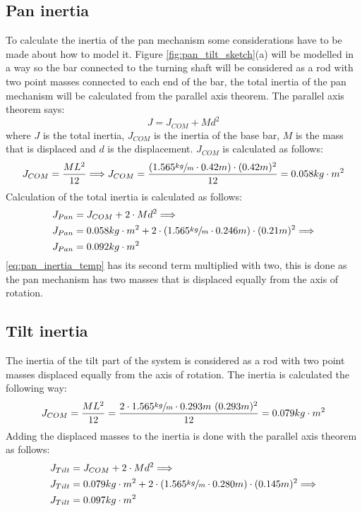 \subsection{Pan inertia}
To calculate the inertia of the pan mechanism some considerations have to be made about how to model it. Figure \ref{fig:pan_tilt_sketch}(a) will be modelled in a way so the bar connected to the turning shaft will be considered as a rod with two point masses connected to each end of the bar, the total inertia of the pan mechanism will be calculated from the parallel axis theorem. The parallel axis theorem says:
\begin{equation}
	J = J_{COM} + M d^{2} \label{eq:parallel_axis_theorem}
\end{equation}
where $J$ is the total inertia, $J_{COM}$ is the inertia of the base bar, $M$ is the mass that is displaced and $d$ is the displacement. $J_{COM}$ is calculated as follows:
\begin{equation}
	J_{COM} = \dfrac{M L^{2}}{12} \Longrightarrow J_{COM} = \dfrac{(1.565\sfrac{kg}{m} \cdot 0.42m) \cdot (0.42m)^{2}}{12} = 0.058 kg \cdot m^{2}
\end{equation}
Calculation of the total inertia is calculated as follows:
\begin{align}
J_{Pan} &= J_{COM} + 2 \cdot M d^{2} \Longrightarrow \\
J_{Pan} &= 0.058 kg \cdot m^{2} + 2 \cdot (1.565\sfrac{kg}{m} \cdot 0.246m) \cdot (0.21m)^{2} \Longrightarrow \label{eq:pan_inertia_temp} \\ 
J_{Pan} &= 0.092 kg \cdot m^{2}\label{eq:pan_inertia}
\end{align}
\ref{eq:pan_inertia_temp} has its second term multiplied with two, this is done as the pan mechanism has two masses that is displaced equally from the axis of rotation.

\subsection{Tilt inertia}
The inertia of the tilt part of the system is considered as a rod with two point masses displaced equally from the axis of rotation. The inertia is calculated the following way:
\begin{equation}
	J_{COM} = \dfrac{ML^{2}}{12} = \dfrac{2 \cdot 1.565 \sfrac{kg}{m} \cdot 0.293 m \ (0.293m)^{2}}{12} = 0.079 kg \cdot m^{2}
\end{equation}
Adding the displaced masses to the inertia is done with the parallel axis theorem as follows:
\begin{align}
J_{Tilt} &= J_{COM} + 2 \cdot M d^{2} \Longrightarrow \\
J_{Tilt} &= 0.079 kg \cdot m^{2} + 2 \cdot (1.565\sfrac{kg}{m} \cdot 0.280m) \cdot (0.145m)^{2} \Longrightarrow \label{eq:tilt_inertia_temp} \\ 
J_{Tilt} &= 0.097 kg \cdot m^{2}\label{eq:tilt_inertia}
\end{align}

